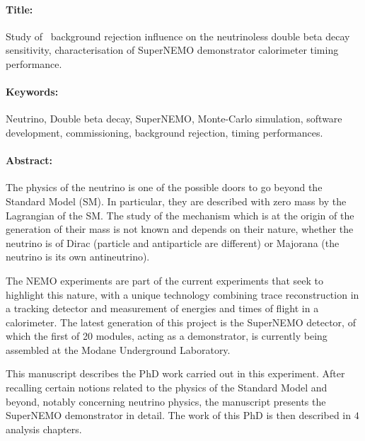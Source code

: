 \begin{mdframed}[linecolor=Prune,linewidth=1]
\vspace{-.25cm}
\begin{footnotesize}
\paragraph*{Title:} Study of \Tl\ background rejection influence on the neutrinoless double beta decay sensitivity, characterisation of SuperNEMO demonstrator calorimeter timing performance.

\vspace{-.25cm}
\paragraph*{Keywords:} Neutrino, Double beta decay, SuperNEMO, Monte-Carlo simulation, software development, commissioning, background rejection, timing performances.

\vspace{-.5cm}
\begin{multicols}{2}
\paragraph*{Abstract:} The physics of the neutrino is one of the possible doors to go beyond the Standard Model (SM).
In particular, they are described with zero mass by the Lagrangian of the SM.
The study of the mechanism which is at the origin of the generation of their mass is not known and depends on their nature, whether the neutrino is of Dirac (particle and antiparticle are different) or Majorana (the neutrino is its own antineutrino).

The NEMO experiments are part of the current experiments that seek to highlight this nature, with a unique technology combining trace reconstruction in a tracking detector and measurement of energies and times of flight in a calorimeter.
The latest generation of this project is the SuperNEMO detector, of which the first of 20 modules, acting as a demonstrator, is currently being assembled at the Modane Underground Laboratory.

This manuscript describes the PhD work carried out in this experiment.
After recalling certain notions related to the physics of the Standard Model and beyond, notably concerning neutrino physics, the manuscript presents the SuperNEMO demonstrator in detail.
The work of this PhD is then described in $4$ analysis chapters.


\end{multicols}
\end{footnotesize}
\end{mdframed}
